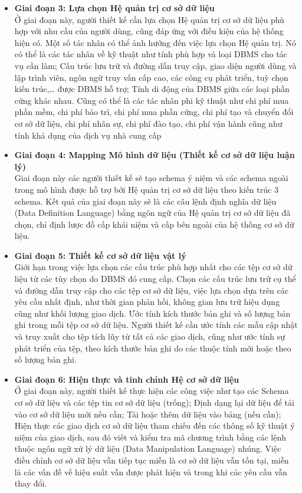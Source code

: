 \begin{itemize}
	\item \textbf{Giai đoạn 3: Lựa chọn Hệ quản trị cơ sở dữ liệu}\\
	\hspace*{0.5cm} Ở giai đoạn này, người thiết kế cần lựa chọn Hệ quản trị cơ sở dữ liệu phù hợp với nhu cầu của người dùng, cũng đáp ứng với điều kiện của hệ thống hiện có. Một số tác nhân có thể ảnh hưởng đến việc lựa chọn Hệ quản trị. Nó có thể là các tác nhân về kỹ thuật như tính phù hợp và loại DBMS cho tác vụ cần làm; Cấu trúc lưu trữ và đường dẫn truy cập, giao diện người dùng và lập trình viên, ngôn ngữ truy vấn cấp cao, các công cụ phát triển, tuỳ chọn kiến trúc,… được DBMS hỗ trợ; Tính di động của DBMS giữa các loại phần cứng khác nhau. Cũng có thể là các tác nhân phi kỹ thuật như chi phí mua phần mềm, chi phí bảo trì, chi phí mua phần cứng, chi phí tạo và chuyển đổi cơ sở dữ liệu, chi phí nhân sự, chi phí đào tạo, chi phí vận hành cũng như tính khả dụng của dịch vụ nhà cung cấp
	\item \textbf{Giai đoạn 4: Mapping Mô hình dữ liệu (Thiết kế cơ sở dữ liệu luận lý)}\\
	\hspace{0.5cm} Giai đoạn này các người thiết kế sẽ tạo schema ý niệm và các schema ngoài trong mô hình được hỗ trợ bởi Hệ quản trị cơ sở dữ liệu theo kiến trúc 3 schema.
	Kết quả của giai đoạn này sẽ là các câu lệnh định nghĩa dữ liệu (Data Definition Language) bằng ngôn ngữ của Hệ quản trị cơ sở dữ liệu đã chọn, chỉ định lược đồ cấp khái niệm và cấp bên ngoài của hệ thống cơ sở dữ liệu.
	\item \textbf{Giai đoạn 5: Thiết kế cơ sở dữ liệu vật lý}\\
	\hspace*{0.5cm} Giới hạn trong việc lựa chọn các cấu trúc phù hợp nhất cho
	các tệp cơ sở dữ liệu từ các tùy chọn do DBMS đó cung cấp.
	Chọn các cấu trúc lưu trữ cụ thể và đường dẫn truy cập cho
	các tệp cơ sở dữ liệu, việc lựa chọn dựa trên các yêu cầu nhất định, như thời gian phản hồi, không gian lưu trữ hiệu dụng cũng như khối lượng giao dịch. Ước tính kích thước bản ghi và số lượng bản ghi trong mỗi tệp cơ sở dữ liệu.
	Người thiết kế cần ước tính các mẫu cập nhật và truy xuất cho tệp tích lũy từ tất cả các giao dịch, cũng như ước tính sự phát triển của tệp, theo kích thước bản ghi do các thuộc tính mới hoặc theo số lượng bản ghi.
	\item \textbf{Giai đoạn 6: Hiện thực và tinh chỉnh Hệ cơ sở dữ liệu}\\
	\hspace*{0.5cm} Ở giai đoạn này, người thiết kế thực hiện các công việc như tạo các Schema cơ sở dữ liệu và các tệp tin cơ sở dữ liệu (trống); Định dạng lại dữ liệu để tải vào cơ sở dữ liệu mới nếu cần; Tải hoặc thêm dữ liệu vào bảng (nếu cần); Hiện thực các giao dịch cơ sở dữ liệu tham chiếu đến các thông số kỹ thuật ý niệm của giao dịch, sau đó viết và kiểm tra mã chương trình bằng các lệnh thuộc ngôn ngữ xử lý dữ liệu (Data Manipulation Language) nhúng. Việc điều chỉnh cơ sở dữ liệu vẫn tiếp tục miễn là cơ sở dữ liệu vẫn tồn tại, miễn là các vấn đề về hiệu suất vẫn được phát hiện và trong khi các yêu cầu vẫn thay đổi.
	
\end{itemize}
